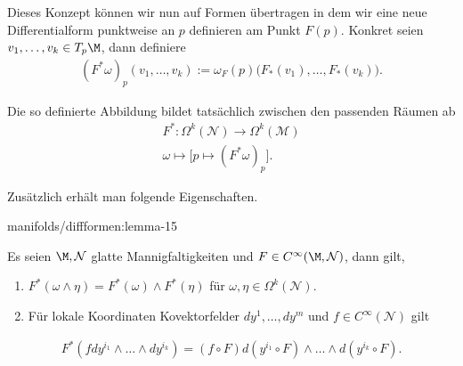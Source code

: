 \documentclass[letterpaper,10pt,english]{jupyterBook}
\begin{document}
\par
Dieses Konzept können wir nun auf Formen übertragen in dem wir eine neue Differentialform punktweise an \(p\) definieren am Punkt \(F(p)\). Konkret seien \(v_1,\ldots, v_k\in T_p\M\), dann definiere
\begin{align*}
(F^\ast\omega)_p (v_1,\ldots,v_k) := \omega_F(p)\big(F_\ast(v_1),\ldots,F_\ast(v_k)\big).
\end{align*}
\par
Die so definierte Abbildung bildet tatsächlich zwischen den passenden Räumen ab
\begin{align*}
F^\ast:\Omega^k(\mathcal{N})\to\Omega^k(\mathcal{M})\\
\omega\mapsto \big[ p\mapsto (F^\ast\omega)_p \big].
\end{align*}
\par
Zusätzlich erhält man folgende Eigenschaften.
\begin{lemma}{}{manifolds/diffformen:lemma-15}



\par
Es seien \(\M,\mathcal{N}\) glatte Mannigfaltigkeiten und \(F\in C^\infty(\M,\mathcal{N})\), dann gilt,
\begin{enumerate}
>>>>>>> main

\par
<<<<<<< HEAD
1. Für \(k=0\) und \(\M\) eine glatte Mannigfaltigkeit erhalten wir
\begin{align*}
\Omega^0(\M) = C^\infty(\M).
\end{align*}


\par
2. Für \(k=1\) und \(\M\) eine glatte Mannigfaltigkeit erhalten wir
\begin{align*}
\Omega^1(\M)
\end{align*}
\par
gerade die Kovektorfelder aus \hyperref[\detokenize{manifolds/tangential:s-kotangbundel}]{Section \ref{\detokenize{manifolds/tangential:s-kotangbundel}}}.

=======
\(F^\ast\) ist linear,

\item {} 
\par
\(F^\ast(\omega\wedge\eta) = F^\ast(\omega) \wedge F^\ast(\eta)\) für \(\omega,\eta\in\Omega^k(\mathcal{N})\).

\item {} 
\par
Für lokale Koordinaten Kovektorfelder \(dy^1,\ldots,dy^m\) und \(f\in C^\infty(\mathcal{N})\) gilt

\end{enumerate}
\begin{align*}
F^\ast(f dy^{i_1}\wedge\ldots\wedge dy^{i_k}) = (f \circ F) d(y^{i_1}\circ F)\wedge\ldots\wedge d(y^{i_k}\circ F).
\end{align*}\end{lemma}
\end{document}
